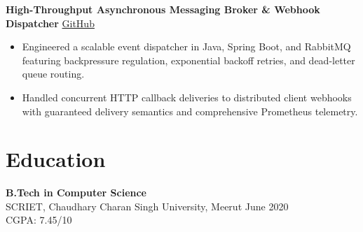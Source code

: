 \documentclass[10pt,a4paper]{article}
\newcommand{\projectheading}[3]{
  \textbf{#1} \hfill
  \href{#2}{#3}\\[-2pt]
}
\begin{document}
\medskip

\projectheading
  {High-Throughput Asynchronous Messaging Broker \& Webhook Dispatcher}
  {https://github.com/sakshi-labs/textToSpeech}
  {GitHub}

\begin{itemize}
  \item Engineered a scalable event dispatcher in Java, Spring Boot, and RabbitMQ featuring backpressure regulation, exponential backoff retries, and dead-letter queue routing.
  \item Handled concurrent HTTP callback deliveries to distributed client webhooks with guaranteed delivery semantics and comprehensive Prometheus telemetry.
\end{itemize}


\section{Education}

\textbf{B.Tech in Computer Science}\\
SCRIET, Chaudhary Charan Singh University, Meerut
\hfill June 2020\\
CGPA: 7.45/10
\end{document}
